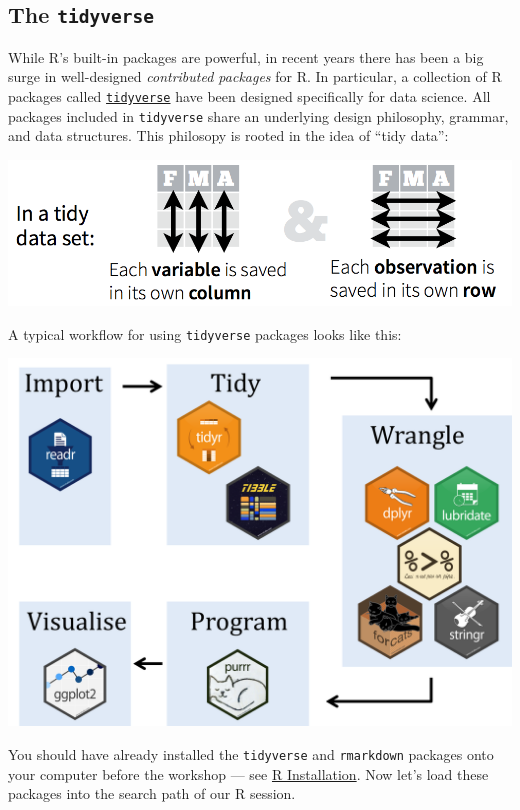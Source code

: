\documentclass[]{book}
\begin{document}
\hypertarget{the-tidyverse}{%
\subsection{\texorpdfstring{The \texttt{tidyverse}}{The tidyverse}}\label{the-tidyverse}}

While R's built-in packages are powerful, in recent years there has
been a big surge in well-designed \emph{contributed packages} for R. In
particular, a collection of R packages called
\href{https://www.tidyverse.org/}{\texttt{tidyverse}} have been
designed specifically for data science. All packages included in
\texttt{tidyverse} share an underlying design philosophy, grammar, and
data structures. This philosopy is rooted in the idea of ``tidy data'':

\includegraphics{R/Rintro/images/tidy_data.png}

A typical workflow for using \texttt{tidyverse} packages looks like this:

\includegraphics{R/Rintro/images/tidy_workflow.png}

You should have already installed the \texttt{tidyverse} and \texttt{rmarkdown}
packages onto your computer before the workshop
--- see \href{./Rinstall.html}{R Installation}.
Now let's load these packages into the search path of our R session.
\end{document}
